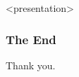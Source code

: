 \begin{frame}<presentation>
  \frametitle{The End}
  \begin{center}
    \LARGE Thank you.
  \end{center}
\end{frame}












